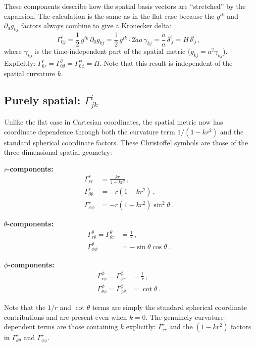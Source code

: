 These components describe how the spatial basis vectors are ``stretched'' by the expansion. The calculation is the same as in the flat case because the $g^{ik}$ and $\partial_0 g_{kj}$ factors always combine to give a Kronecker delta:
\begin{equation}\label{eq:gammai0j}
    \Gamma^i_{0j} = \frac{1}{2}\,g^{ik}\,\partial_0 g_{kj} = \frac{1}{2}\,g^{ik}\cdot 2\dot{a}a\,\gamma_{kj} = \frac{\dot{a}}{a}\,\delta^i_{\ j} = H\,\delta^i_{\ j}\,,
\end{equation}
where $\gamma_{kj}$ is the time-independent part of the spatial metric ($g_{kj}=a^2\gamma_{kj}$). Explicitly: $\Gamma^r_{0r}=\Gamma^\theta_{0\theta}=\Gamma^\phi_{0\phi}=H$. Note that this result is independent of the spatial curvature $k$.

\subsection*{Purely spatial: $\Gamma^i_{jk}$}

Unlike the flat case in Cartesian coordinates, the spatial metric now has coordinate dependence through both the curvature term $1/(1-kr^2)$ and the standard spherical coordinate factors. These Christoffel symbols are those of the three-dimensional spatial geometry:

\medskip
\noindent\textbf{$r$-components:}
\begin{align}
    \Gamma^r_{rr} &= \frac{kr}{1-kr^2}\,,\\[4pt]
    \Gamma^r_{\theta\theta} &= -r(1-kr^2)\,,\\[4pt]
    \Gamma^r_{\phi\phi} &= -r(1-kr^2)\sin^2\!\theta\,.
\end{align}

\noindent\textbf{$\theta$-components:}
\begin{align}
    \Gamma^\theta_{r\theta} = \Gamma^\theta_{\theta r} &= \frac{1}{r}\,,\\[4pt]
    \Gamma^\theta_{\phi\phi} &= -\sin\theta\cos\theta\,.
\end{align}

\noindent\textbf{$\phi$-components:}
\begin{align}
    \Gamma^\phi_{r\phi} = \Gamma^\phi_{\phi r} &= \frac{1}{r}\,,\\[4pt]
    \Gamma^\phi_{\theta\phi} = \Gamma^\phi_{\phi\theta} &= \cot\theta\,.
\end{align}

Note that the $1/r$ and $\cot\theta$ terms are simply the standard spherical coordinate contributions and are present even when $k=0$. The genuinely curvature-dependent terms are those containing $k$ explicitly: $\Gamma^r_{rr}$ and the $(1-kr^2)$ factors in $\Gamma^r_{\theta\theta}$ and $\Gamma^r_{\phi\phi}$.

